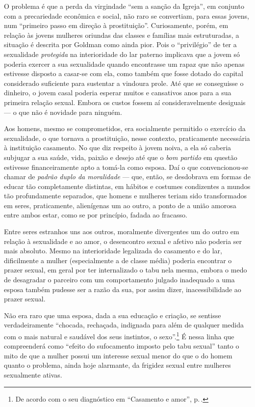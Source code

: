 O problema é que a perda da virgindade ``sem a sanção da
Igreja'', em conjunto com a precariedade econômica e social, não raro se
convertiam, para essas jovens, num ``primeiro passo em direção à
prostituição''. Curiosamente, porém, em relação às jovens
mulheres oriundas das classes e famílias mais estruturadas, a situação é
descrita por Goldman como ainda pior. Pois o ``privilégio'' de ter a
sexualidade \textit{protegida} na interioridade do lar paterno implicava que
a jovem só poderia exercer a sua sexualidade quando
encontrasse um rapaz que não apenas estivesse disposto a casar-se com
ela, como também que fosse dotado do capital considerado
suficiente para sustentar a vindoura prole. Até que se conseguisse o
dinheiro, o jovem casal poderia esperar muitos e
cansativos anos para a sua primeira relação sexual. Embora os
custos fossem aí consideravelmente desiguais --- o que não é novidade
para ninguém.

Aos homens, mesmo se comprometidos, era socialmente
permitido o exercício da sexualidade, o que tornava a prostituição,
nesse contexto, praticamente necessária à instituição
casamento. No que diz respeito à jovem noiva, a ela só caberia subjugar
a sua saúde, vida, paixão e desejo até que o \textit{bom partido} em questão
estivesse financeiramente apto a tomá-la como esposa. Daí o que
convencionou-se chamar de \textit{padrão duplo da moralidade} --- que, então,
se desdobrava em formas de educar tão completamente distintas, em
hábitos e costumes condizentes a mundos tão profundamente separados, que
homens e mulheres teriam sido transformados em seres, praticamente,
alienígenas um ao outro, a ponto de a união amorosa entre ambos estar,
como se por princípio, fadada ao fracasso.

Entre seres estranhos uns aos outros, moralmente divergentes um do
outro em relação à sexualidade e ao amor, o desencontro sexual
e afetivo não poderia ser mais absoluto. Mesmo na interioridade
legalizada do casamento e do lar, dificilmente a mulher (especialmente
a de classe média) poderia encontrar o prazer sexual, em
geral por ter internalizado o tabu nela mesma, embora
o medo de desagradar o parceiro com um comportamento julgado
inadequado a uma esposa também pudesse ser a razão da sua, por assim dizer,
inacessibilidade ao prazer sexual.

Não era raro que uma esposa, dada a sua educação e
criação, se sentisse verdadeiramente ``chocada, rechaçada, indignada
para além de qualquer medida com o mais natural e saudável dos seus
instintos, o sexo''.\footnote{De acordo com o seu diagnóstico em
``Casamento e amor'', p.\,\pageref{artesao}.}
É nessa linha que compreenderá como ``efeito do
sufocamento imposto pelo tabu sexual'' tanto o mito de que a mulher
possui um interesse sexual menor do que o do homem quanto o problema,
ainda hoje alarmante, da frigidez sexual entre mulheres sexualmente
ativas.

